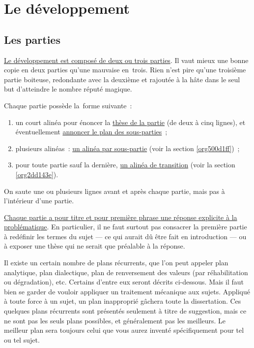 \documentclass[a4paper,12pt]{article}
\begin{document}
\section{Le développement}
\label{sec:orge9d7e29}
\label{org8545314}

\subsection{Les parties}
\label{sec:org5f8925c}
\label{org750dc46}

\uline{Le développement est composé de deux ou trois parties}. Il vaut mieux
une bonne copie en deux parties qu'une mauvaise en trois. Rien n'est
pire qu'une troisième partie boiteuse, redondante avec la deuxième et
rajoutée à la hâte dans le seul but d'atteindre le nombre réputé
magique.

Chaque partie possède la forme suivante :

\begin{enumerate}
\item un court alinéa pour énoncer la \uline{thèse de la partie} (de deux à cinq
lignes), et éventuellement \uline{annoncer le plan des sous-parties} ;
\item plusieurs alinéas : \uline{un alinéa par sous-partie} (voir la section
\ref{org500d1ff}) ;
\item pour toute partie sauf la dernière, \uline{un alinéa de transition} (voir
la section \ref{org2dd143e}).
\end{enumerate}

On saute une ou plusieurs lignes avant et après chaque partie, mais pas
à l'intérieur d'une partie.

\uline{Chaque partie a pour titre et pour première phrase une réponse
explicite à la problématique}. En particulier, il ne faut surtout pas
consacrer la première partie à redéfinir les termes du sujet --- ce qui
aurait dû être fait en introduction --- ou à exposer une thèse qui ne
serait que préalable à la réponse.

Il existe un certain nombre de plans récurrents, que l'on peut appeler
plan analytique, plan dialectique, plan de renversement des valeurs (par
réhabilitation ou dégradation), etc. Certains d'entre eux seront décrits
ci-dessous. Mais il faut bien se garder de vouloir appliquer un
traitement mécanique aux sujets. Appliqué à toute force à un sujet, un
plan inapproprié gâchera toute la dissertation. Ces quelques plans
récurrents sont présentés seulement à titre de suggestion, mais ce ne
sont pas les seuls plans possibles, et généralement pas les meilleurs.
Le meilleur plan sera toujours celui que vous aurez inventé
spécifiquement pour tel ou tel sujet.
\end{document}
